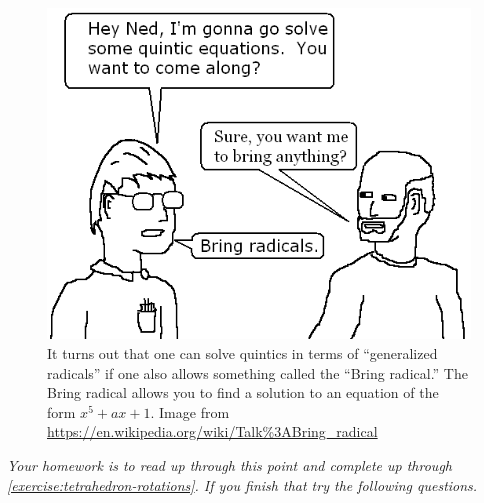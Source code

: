 \documentclass[reqno, 12pt, letter]{article}
\theoremstyle{plain}
\theoremstyle{definition}
\theoremstyle{remark}
\numberwithin{equation}{section}
\begin{document}
\begin{figure}[H]
	\begin{center}
	\includegraphics[scale=.5]{bring-radical.png}
\end{center}
\caption{
It turns out that one can solve quintics in terms of ``generalized
	radicals'' if one also allows something called the
	``Bring radical.''
	The Bring radical allows you to find a solution
	to an equation of the form $x^5 + ax + 1$.
Image from \url{https://en.wikipedia.org/wiki/Talk\%3ABring_radical}}
		\label{figure:bring-radicals}
\end{figure}


\newpage

\iffalse
{\it Your homework is to read up through this point and complete up through \autoref{exercise:tetrahedron-rotations}. If you finish that try the following questions.}
\end{document}
